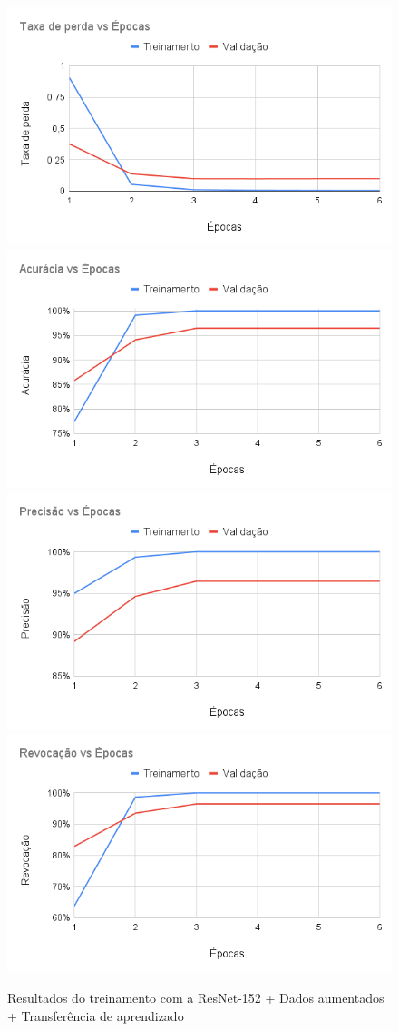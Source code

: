 \documentclass[
	12pt,				%
	oneside,			%
	a4paper,			%
	english,			%
	brazil				%
	]{abntex2ppgsi}
\begin{document}
\begin{figure}[H]
    \centering
    \caption{Resultados do treinamento com a ResNet-152 + Dados aumentados + Transferência de aprendizado}
    \includegraphics[width=.50\textwidth]{imagens/resultados_discussao/architecture/resnet_152/transfer_learning/augmented/perda.png}\hfill
    \includegraphics[width=.50\textwidth]{imagens/resultados_discussao/architecture/resnet_152/transfer_learning/augmented/acuracia.png}\bigbreak    \includegraphics[width=.50\textwidth]{imagens/resultados_discussao/architecture/resnet_152/transfer_learning/augmented/precisao.png}\hfill
    \includegraphics[width=.50\textwidth]{imagens/resultados_discussao/architecture/resnet_152/transfer_learning/augmented/revocacao.png}
    \label{fig:resnet_152_augmented_transfer_learning}
\end{figure}
\end{document}
